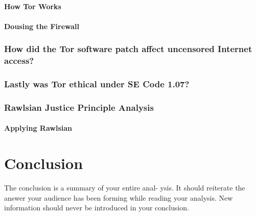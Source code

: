 \documentclass[11pt]{article}
\begin{document}
\begin{multicols}{2}
\paragraph{How Tor Works}

\paragraph{Dousing the Firewall}

\subsubsection{How did the Tor software patch affect uncensored Internet
access?}

\subsubsection{Lastly was Tor ethical under SE Code 1.07?}

\subsubsection{Rawlsian Justice Principle Analysis}


\paragraph{Applying Rawlsian}


\section{Conclusion} The conclusion is a summary of your entire anal- ysis. It
should reiterate the answer your audience has been forming while reading your
analysis. New information should never be introduced in your conclusion.
\cite{texTemp}

\end{multicols} \newpage

\nocite{*}




\end{document}

